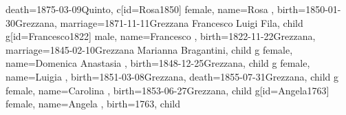 \documentclass{article}
\begin{document}
\begin{midpage}
\begin{center}
\begin{genealogypicture}
{{{{{{{{{{                                        death={1875-03-09}{Quinto},
                                    }
                                    c[id=Rosa1850]{
                                        female,
                                        name={Rosa },
                                        birth={1850-01-30}{Grezzana},
                                        marriage={1871-11-11}{Grezzana \newline Francesco Luigi Fila},
                                    }
                                }
                                child{
                                    g[id=Francesco1822]{
                                        male,
                                        name={Francesco },
                                        birth={1822-11-22}{Grezzana},
                                        marriage={1845-02-10}{Grezzana \newline Marianna Bragantini},
                                    }
                                    child{
                                        g{
                                            female,
                                            name={Domenica Anastasia },
                                            birth={1848-12-25}{Grezzana},
                                        }
                                    }
                                    child{
                                        g{
                                            female,
                                            name={Luigia },
                                            birth={1851-03-08}{Grezzana},
                                            death={1855-07-31}{Grezzana},
                                        }
                                    }
                                    child{
                                        g{
                                            female,
                                            name={Carolina },
                                            birth={1853-06-27}{Grezzana},
                                        }
                                    }
                                }
                            }
                        }
                        child{
                            g[id=Angela1763]{
                                female,
                                name={Angela },
                                birth={1763}{},
                            }
                        }
                        child{
}}}}}}}
\end{genealogypicture}
\end{center}
\end{midpage}
\end{document}
